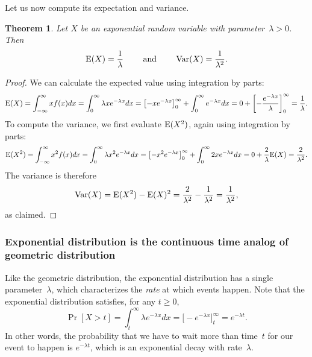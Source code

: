 \documentclass[11pt]{article}
\def\Ex#1{{\rm E}(#1)}
\def\Var#1{{\rm Var}(#1)}
\newcounter{thm}
\newtheorem{theorem}{Theorem}[thm]
\begin{document}
Let us now compute its expectation and variance.

\begin{theorem}
Let $X$ be an exponential random variable with parameter~$\lambda > 0$. Then
$$\Ex{X} = \frac{1}{\lambda} \qquad \text{ and } \qquad \Var{X} = \frac{1}{\lambda^2}.$$
\end{theorem}
\begin{proof}
We can calculate the expected value using integration by parts:
$$
   \Ex{X} = \int_{-\infty}^\infty xf(x) dx = \int_0^\infty \lambda xe^{-\lambda x}dx
             = \bigl[-xe^{-\lambda x}\bigr]_0^\infty + \int_0^\infty e^{-\lambda x} dx
             = 0 + \left[-\frac{e^{-\lambda x}}{\lambda}\right]_0^\infty = \frac{1}{\lambda}.  $$
To compute the variance, we first evaluate $\Ex{X^2}$, again using integration by parts:
$$ \Ex{X^2} = \int_{-\infty}^\infty x^2f(x) dx = \int_0^\infty \lambda x^2e^{-\lambda x}dx
             = \bigl[-x^2e^{-\lambda x}\bigr]_0^\infty + \int_0^\infty 2xe^{-\lambda x} dx
             = 0 + \frac{2}{\lambda}\Ex{X} = \frac{2}{\lambda^2}.  $$
The variance is therefore $$
   \Var{X} = \Ex{X^2} - \Ex{X}^2 = \frac{2}{\lambda^2} - \frac{1}{\lambda^2} = \frac{1}{\lambda^2},$$
as claimed.
\end{proof}


\subsubsection*{Exponential distribution is the continuous time analog of geometric distribution}

Like the geometric distribution, the exponential distribution has a single parameter~$\lambda$,
which characterizes the {\it rate\/} at which events happen.
Note that the exponential distribution satisfies, for any $t\ge 0$,
\begin{equation}\label{eq:exptail}
   \Pr[X> t] = \int_t^\infty \lambda e^{-\lambda x} dx = \bigl[-e^{-\lambda x}\bigr]_t^\infty
                  = e^{-\lambda t}.
\end{equation}
In other words, the probability that we have to wait more than time~$t$ for our event
to happen is $e^{-\lambda t}$, which is an exponential decay with rate~$\lambda$.
\end{document}
